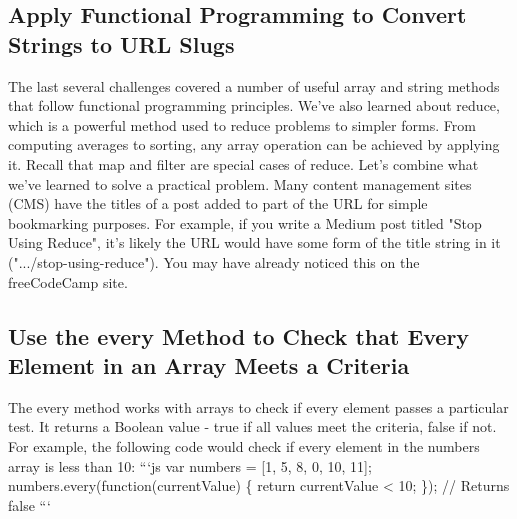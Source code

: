 \documentclass{article}%
\begin{document}
%
\subsection{Apply Functional Programming to Convert Strings to URL Slugs}%
\label{subsec:ApplyFunctionalProgrammingtoConvertStringstoURLSlugs}%
The last several challenges covered a number of useful array and string methods that follow functional programming principles. We've also learned about reduce, which is a powerful method used to reduce problems to simpler forms. From computing averages to sorting, any array operation can be achieved by applying it. Recall that map and filter are special cases of reduce.\newline%
Let's combine what we've learned to solve a practical problem.\newline%
Many content management sites (CMS) have the titles of a post added to part of the URL for simple bookmarking purposes. For example, if you write a Medium post titled "Stop Using Reduce", it's likely the URL would have some form of the title string in it (".../stop{-}using{-}reduce"). You may have already noticed this on the freeCodeCamp site.\newline%

%
\subsection{Use the every Method to Check that Every Element in an Array Meets a Criteria}%
\label{subsec:UsetheeveryMethodtoCheckthatEveryElementinanArrayMeetsaCriteria}%
The every method works with arrays to check if every element passes a particular test. It returns a Boolean value {-} true if all values meet the criteria, false if not.\newline%
For example, the following code would check if every element in the numbers array is less than 10:\newline%
```js\newline%
var numbers = {[}1, 5, 8, 0, 10, 11{]};\newline%
numbers.every(function(currentValue) \{\newline%
  return currentValue < 10;\newline%
\});\newline%
// Returns false\newline%
```\newline%

%
\end{document}
